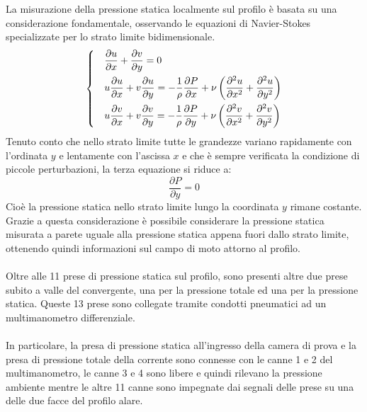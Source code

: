 \noindent La misurazione della pressione statica localmente sul profilo è basata su una considerazione fondamentale, osservando le equazioni di Navier-Stokes specializzate per lo strato limite bidimensionale.
\begin{equation*}
    \begin{dcases}
        &\frac{\partial u}{\partial x} + \frac{\partial v}{\partial y} = 0\\
        & u\frac{\partial u}{\partial x} + v\frac{\partial u}{\partial y} = -\frac1\rho \frac{\partial P}{\partial x} + \nu\left( \frac{\partial^2 u}{\partial x^2} + \frac{\partial^2 u}{\partial y^2} \right)\\
        & u\frac{\partial v}{\partial x} + v\frac{\partial v}{\partial y} = -\frac1\rho \frac{\partial P}{\partial y} + \nu\left( \frac{\partial^2 v}{\partial x^2} + \frac{\partial^2 v}{\partial y^2} \right)
    \end{dcases}
\end{equation*}
Tenuto conto che nello strato limite tutte le grandezze variano rapidamente con l'ordinata $y$ e lentamente con l'ascissa $x$ e che è sempre verificata la condizione di piccole perturbazioni, la terza equazione si riduce a:
\begin{equation*}
    \frac{\partial P}{\partial y} = 0
\end{equation*}
Cioè la pressione statica nello strato limite lungo la coordinata $y$ rimane costante. Grazie a questa considerazione è possibile considerare la pressione statica misurata a parete uguale alla pressione statica appena fuori dallo strato limite, ottenendo quindi informazioni sul campo di moto attorno al profilo.\\\\
Oltre alle 11 prese di pressione statica sul profilo, sono presenti altre due prese subito a valle del convergente, una per la pressione totale ed una per la pressione statica. Queste 13 prese sono collegate tramite condotti pneumatici ad un multimanometro differenziale.\\\\
In particolare, la presa di pressione statica all'ingresso della camera di prova e la presa di pressione totale della corrente sono connesse con le canne 1 e 2 del multimanometro, le canne 3 e 4 sono libere e quindi rilevano la pressione ambiente mentre le altre 11 canne sono impegnate dai segnali delle prese su una delle due facce del profilo alare.
